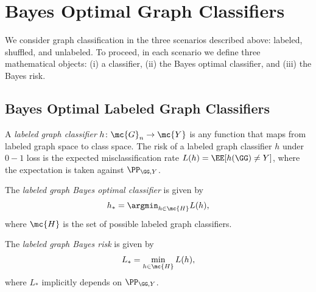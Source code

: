 \documentclass[10pt,journal,cspaper,compsoc]{IEEEtran}
\begin{document}
\section{Bayes Optimal Graph Classifiers} %
\label{sec:bayes_optimal_graph_classifiers}

We consider graph classification in the three scenarios described above: labeled, shuffled, and unlabeled.  To proceed, in each scenario we define three mathematical objects: (i) a classifier, (ii) the Bayes optimal classifier, and (iii) the Bayes risk.

\subsection{Bayes Optimal Labeled Graph Classifiers} %
\label{sub:labeled_graph_classifiers}


	A \emph{labeled graph classifier} $h\colon \mc{G}_n \to \mc{Y}$ is any function that maps from labeled graph space to class space. The risk of a labeled graph classifier $h$ under $0-1$ loss is the expected misclassification rate $L(h)=\EE[h(\GG)\neq Y]$, where the expectation is taken against $\PP_{\GG,Y}$.
	
	The \emph{labeled graph Bayes optimal classifier} is given by
	\begin{align}
		h_* = \argmin_{h \in \mc{H}} L(h),
	\end{align}
	where $\mc{H}$ is the set of possible labeled graph classifiers.
	
	The \emph{labeled graph Bayes risk} is given by 
	\begin{align}
		L_* =\min_{h \in \mc{H}} L(h),
	\end{align}
	where $L_*$ implicitly depends on $\PP_{\GG,Y}$.
\end{document}
